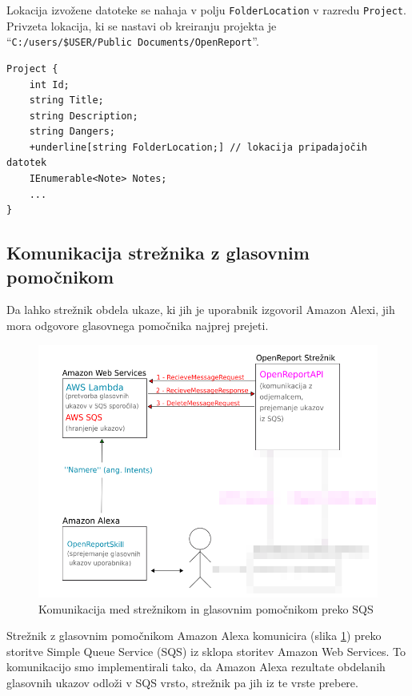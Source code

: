 \documentclass[a4paper, 12pt]{book}
\begin{document}
Lokacija izvožene datoteke se nahaja v polju \texttt{FolderLocation} v razredu \texttt{Project}.
Privzeta lokacija, ki se nastavi ob kreiranju projekta je 
\\\enquote{\texttt{C:/users/\$USER/Public Documents/OpenReport}}.

\begin{Verbatim}[commandchars=+\[\]]
Project {
    int Id; 
    string Title; 
    string Description; 
    string Dangers; 
    +underline[string FolderLocation;] // lokacija pripadajočih datotek 
    IEnumerable<Note> Notes; 
    ... 
}
\end{Verbatim}

\subsection{Komunikacija strežnika z glasovnim pomočnikom}

Da lahko strežnik obdela ukaze, ki jih je uporabnik izgovoril Amazon Alexi, jih mora odgovore glasovnega pomočnika najprej prejeti.

\begin{figure}[H]
\begin{center}
\includegraphics[width=13cm]{plan_sqs_server_alexa}
\end{center}
\caption{Komunikacija med strežnikom in glasovnim pomočnikom preko SQS}
\label{plan_sqs_server_alexa}
\end{figure}


Strežnik z glasovnim pomočnikom Amazon Alexa komunicira (slika \ref{plan_sqs_server_alexa}) preko storitve Simple Queue Service (SQS) iz sklopa storitev Amazon Web Services.
To komunikacijo smo implementirali tako, da Amazon Alexa rezultate obdelanih glasovnih ukazov odloži v SQS vrsto, strežnik pa jih iz te vrste prebere.
\end{document}
